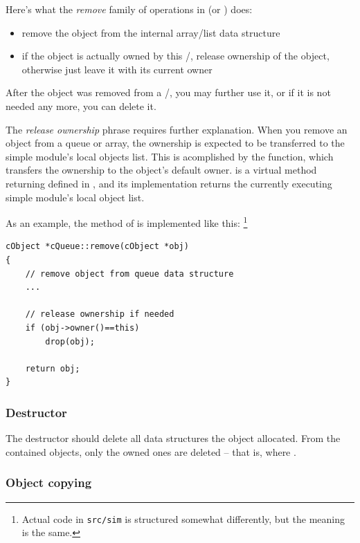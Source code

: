 Here's what the \textit{remove} family of operations in 
(or ) does:

\begin{itemize}
    \item{remove the object from the internal array/list data structure}

    \item{if the object is actually owned by this /,
    release ownership of the object, otherwise just leave it with
    its current owner}
\end{itemize}

After the object was removed from a /,
you may further use it, or if it is not needed any more, you can delete it.

The \textit{release ownership} phrase requires further explanation.
When you remove an object from a queue or array, the ownership
is expected to be transferred to the simple module's local objects list.
This is acomplished by the  function, which transfers the
ownership to the object's default owner.
 is a virtual method returning 
defined in , and its implementation returns
the currently executing simple module's local object list.

As an example, the  method of  is
implemented like this:
  \footnote{Actual code in \texttt{src/sim} is structured somewhat
  differently, but the meaning is the same.}

\begin{verbatim}
cObject *cQueue::remove(cObject *obj)
{
    // remove object from queue data structure
    ...

    // release ownership if needed
    if (obj->owner()==this)
        drop(obj);

    return obj;
}
\end{verbatim}


\subsubsection{Destructor}

The destructor should delete all data structures the object allocated.
From the contained objects, only the owned ones are deleted -- that is,
where .


\subsubsection{Object copying}

